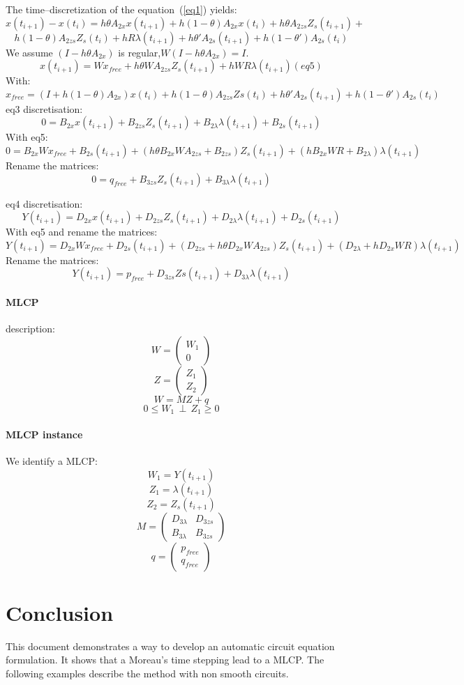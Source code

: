  The time--discretization of the equation~(\ref{eq1}) yields:
\[x(t_{i+1}) - x(t_{i})=h\theta A_{2x}x(t_{i+1})+h(1-\theta)A_{2x}x(t_{i}) +h\theta
A_{2zs}Z_{s}(t_{i+1}) +\]
\[h(1-\theta)A_{2zs}Z_s(t_{i}) +hR\lambda (t_{i+1}) + h\theta 'A_{2s}(t_{i+1}) +
h(1-\theta ')A_{2s}(t_{i})\]
We assume $(I-h\theta A_{2x})$ is regular,$W(I-h\theta A_{2x}) = I.$
\[x(t_{i+1})=Wx_{free}+h\theta WA_{2zs}Z_{s}(t_{i+1})+hWR\lambda (t_{i+1})  (eq5)\]
With:
\[x_{free}=(I+h(1-\theta)A_{2x})x(t_{i}) + h(1-\theta )A_{2zs}Zs(t_{i}) + h\theta 'A_{2s}(t_{i+1}) +
h(1-\theta ')A_{2s}(t_{i})\]
eq3 discretisation:
\[0 = B_{2x}x(t_{i+1})+B_{2zs}Z_{s}(t_{i+1}) + B_{2\lambda}\lambda(t_{i+1})+B_{2s}(t_{i+1})\]
With eq5:
\[0 = B_{2x}Wx_{free}+B_{2s}(t_{i+1})+(h\theta B_{2x} WA_{2zs}+B_{2zs}) Z_{s}(t_{i+1})+(hB_{2x}WR+B_{2\lambda})\lambda(t_{i+1})\]
Rename the matrices:
\[0 = q_{free}+B_{3zs} Z_{s}(t_{i+1})+B_{3\lambda}\lambda(t_{i+1})\]

eq4 discretisation:
\[Y(t_{i+1})=D_{2x}x(t_{i+1})+D_{2zs}Z_{s}(t_{i+1}) +D_{2\lambda}\lambda(t_{i+1})+D_{2s}(t_{i+1})\]
With eq5 and rename the matrices:
\[Y(t_{i+1})=D_{2x}Wx_{free}+ D_{2s}(t_{i+1})+(D_{2zs}+h\theta
D_{2x}WA_{2zs})Z_{s}(t_{i+1})+(D_{2\lambda} + hD_{2x}WR)\lambda(t_{i+1})\]
Rename the matrices:
\[Y(t_{i+1})=p_{free}+D_{3zs}Zs(t_{i+1}) +D_{3\lambda}\lambda (t_{i+1})\]

\paragraph{MLCP}
description:\\

\[W=\left(\begin{array}{c}W_{1}\\0\end{array}\right)\]
\[Z=\left(\begin{array}{c}Z_{1}\\Z_{2}\end{array}\right)\]
\[W=MZ+q\]
\[0 \leq W_{1} \, \perp \, Z_{1} \geq 0\]
\paragraph{MLCP instance}
We identify a MLCP:\\
\[W_{1} = Y(t_{i+1})\]
\[Z_{1} = \lambda(t_{i+1})\]
\[Z_{2} = Z_{s}(t_{i+1})\]
\[M = \left(\begin{array}{cc}
  D_{3\lambda}&D_{3zs}\\
B_{3\lambda}&B_{3zs}
\end{array}\right)\]
\[q=\left(\begin{array}{c}
p_{free}\\
q_{free}\end{array}\right)\]
\section{Conclusion}
This document demonstrates a way to develop an automatic circuit equation formulation. It shows that a Moreau's time
stepping lead to a MLCP. The following examples describe the method with non smooth circuits.




